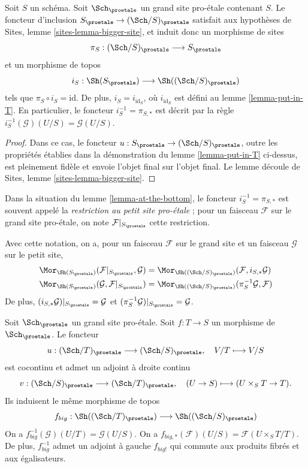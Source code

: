 \begin{lemma}
\label{lemma-at-the-bottom}
Soit $S$ un schéma. Soit $\Sch_\proetale$ un grand site pro-\'etale
contenant $S$.
Le foncteur d'inclusion $S_\proetale \to (\Sch/S)_\proetale$
satisfait aux hypothèses de Sites, lemme \ref{sites-lemma-bigger-site},
et induit donc un morphisme de sites
$$
\pi_S : (\Sch/S)_\proetale \longrightarrow S_\proetale
$$
et un morphisme de topos
$$
i_S : \Sh(S_\proetale) \longrightarrow \Sh((\Sch/S)_\proetale)
$$
tels que $\pi_S \circ i_S = \text{id}$. De plus, $i_S = i_{\text{id}_S}$,
où $i_{\text{id}_S}$ est défini au lemme \ref{lemma-put-in-T}. En particulier, le
foncteur $i_S^{-1} = \pi_{S, *}$ est décrit par la règle
$i_S^{-1}(\mathcal{G})(U/S) = \mathcal{G}(U/S)$.
\end{lemma}

\begin{proof}
Dans ce cas, le foncteur $u : S_\proetale \to (\Sch/S)_\proetale$,
outre les propriétés établies dans la démonstration du
lemme \ref{lemma-put-in-T} ci-dessus, est pleinement fidèle
et envoie l'objet final sur l'objet final.
Le lemme découle de Sites, lemme \ref{sites-lemma-bigger-site}.
\end{proof}

\begin{definition}
\label{definition-restriction-small-proetale}
Dans la situation du
lemme \ref{lemma-at-the-bottom},
le foncteur $i_S^{-1} = \pi_{S, *}$ est souvent
appelé la {\it restriction au petit site pro-\'etale} ; pour un faisceau
$\mathcal{F}$ sur le grand site pro-\'etale, on note
$\mathcal{F}|_{S_\proetale}$ cette restriction.
\end{definition}

\noindent
Avec cette notation, on a, pour un faisceau $\mathcal{F}$ sur le
grand site et un faisceau $\mathcal{G}$ sur le petit site,
\begin{align*}
\Mor_{\Sh(S_\proetale)}(\mathcal{F}|_{S_\proetale}, \mathcal{G})
& =
\Mor_{\Sh((\Sch/S)_\proetale)}(\mathcal{F},
i_{S, *}\mathcal{G}) \\
\Mor_{\Sh(S_\proetale)}(\mathcal{G}, \mathcal{F}|_{S_\proetale})
& =
\Mor_{\Sh((\Sch/S)_\proetale)}(\pi_S^{-1}\mathcal{G}, \mathcal{F})
\end{align*}
De plus, $(i_{S, *}\mathcal{G})|_{S_\proetale} = \mathcal{G}$
et $(\pi_S^{-1}\mathcal{G})|_{S_\proetale} = \mathcal{G}$.

\begin{lemma}
\label{lemma-morphism-big}
Soit $\Sch_\proetale$ un grand site pro-\'etale.
Soit $f : T \to S$ un morphisme de $\Sch_\proetale$.
Le foncteur
$$
u : (\Sch/T)_\proetale \longrightarrow (\Sch/S)_\proetale, \quad
V/T \longmapsto V/S
$$
est cocontinu et admet un adjoint à droite continu
$$
v : (\Sch/S)_\proetale \longrightarrow (\Sch/T)_\proetale, \quad
(U \to S) \longmapsto (U \times_S T \to T).
$$
Ils induisent le même morphisme de topos
$$
f_{big} :
\Sh((\Sch/T)_\proetale)
\longrightarrow
\Sh((\Sch/S)_\proetale)
$$
On a $f_{big}^{-1}(\mathcal{G})(U/T) = \mathcal{G}(U/S)$.
On a $f_{big, *}(\mathcal{F})(U/S) = \mathcal{F}(U \times_S T/T)$.
De plus, $f_{big}^{-1}$ admet un adjoint à gauche $f_{big!}$ qui commute aux
produits fibrés et aux égalisateurs.
\end{lemma}

